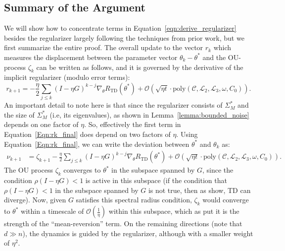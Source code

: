 \subsection{Summary of the Argument}
We will show how to concentrate terms in Equation~\ref{eqn:derive_regularizer} besides the regularizer largely following the techniques from prior work, but we first summarize the entire proof. The overall update to the vector $r_k$ which measures the displacement between the parameter vector $\theta_k - \theta^*$ and the OU-process $\zeta_k$ can be written as follows, and it is governed by the derivative of the implicit regularizer (modulo error terms):
\begin{equation}
\label{Eqn:rk_final}
    r_{k+1} = - \frac{\eta}{2} \sum_{j \leq k} (I - \eta G)^{k - j} \nabla_\theta R_\mathrm{TD}(\theta^*) + \mathcal{O}\left(\sqrt{\eta t} \cdot \mathrm{poly}(\mathscr{C}, \mathscr{L}_2, \mathscr{L}_3, \omega, C_0)\right).   
\end{equation}
An important detail to note here is that since the regularizer consists of $\Sigma^*_M$ and the size of $\Sigma^*_M$ (i.e, its eigenvalues), as shown in Lemma~\ref{lemma:bounded_noise} depends on one factor of $\eta$. So, effectively the first term in Equation~\ref{Eqn:rk_final} does depend on two factors of $\eta$. Using Equation~\ref{Eqn:rk_final}, we can write the deviation between $\theta^*$ and $\theta_k$ as:
\begin{align}
\nu_{k+1} &= \zeta_{k+1} - \frac{\eta}{2} \sum_{j \leq k} (I - \eta G)^{k - j} \nabla_\theta R_\mathrm{TD}(\theta^*) + \mathcal{O}\left(\sqrt{\eta t} \cdot \mathrm{poly}(\mathscr{C}, \mathscr{L}_2, \mathscr{L}_3, \omega, C_0)\right).
\end{align}
The OU process $\zeta_k$ converges to $\theta^*$ in the subspace spanned by $G$, since the condition $\rho(I - \eta G) < 1$ is active in this subspace (if the condition that $\rho(I - \eta G) < 1$ in the subspace spanned by $G$ is not true, then as \citet{ghosh2020representations} show, TD can diverge). Now, given $G$ satisfies this spectral radius condition, $\zeta_k$ would converge to $\theta^*$ within a timescale of $\mathcal{O}\left(\frac{1}{\eta} \right)$ within this subspace, which as \citet{blanc2020implicit} put it is the strength of the ``mean-reversion'' term. On the remaining directions (note that $d \gg n$), the dynamics is guided by the regularizer, although with a smaller weight of $\eta^2$. 


